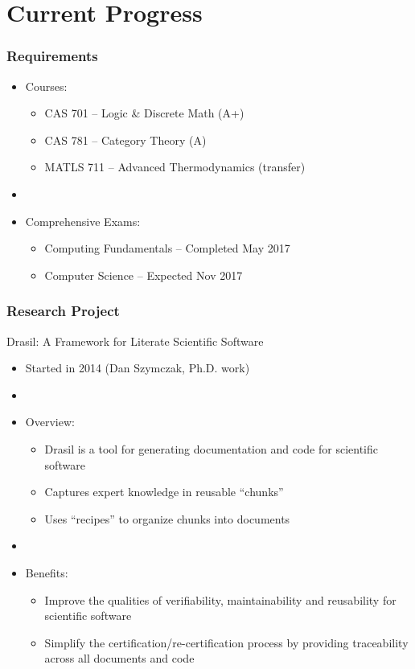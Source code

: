 \documentclass{beamer}
\begin{document}
\section[Progress]{Current Progress}


\begin{frame}

\frametitle{Requirements}

\begin{itemize}
\item Courses:
	\begin{itemize}
	\item CAS 701 -- Logic \& Discrete Math (A+)
	\item CAS 781 -- Category Theory (A)
	\item MATLS 711 -- Advanced Thermodynamics (transfer)
	\end{itemize}
\item[]
\item Comprehensive Exams:
    \begin{itemize}
    \item Computing Fundamentals -- Completed May 2017
    \item Computer Science -- Expected Nov 2017
    \end{itemize}
\end{itemize}
\end{frame}

\begin{frame}

\frametitle{Research Project}

Drasil: A Framework for Literate Scientific Software

\begin{itemize}
\item Started in 2014 (Dan Szymczak, Ph.D. work)
\item[]
\item Overview:
\begin{itemize}
\item Drasil is a tool for generating documentation and code for scientific software
\item Captures expert knowledge in reusable ``chunks''
\item Uses ``recipes'' to organize chunks into documents 
\end{itemize}
\item[]
\item Benefits:
\begin{itemize}
\item Improve the qualities of verifiability, maintainability and reusability for scientific software
\item Simplify the certification/re-certification process by providing traceability across all documents and code
\end{itemize}
\end{itemize}
\end{frame}
\end{document}
